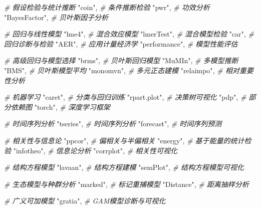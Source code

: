 \documentclass[
  twoside,12pt,fontset=none]{ctexbook}
\newenvironment{Shaded}{\begin{snugshade}}{\end{snugshade}}
\newcommand{\CommentTok}[1]{\textcolor[rgb]{0.56,0.35,0.01}{\textit{#1}}}
\newcommand{\NormalTok}[1]{#1}
\newcommand{\StringTok}[1]{\textcolor[rgb]{0.31,0.60,0.02}{#1}}
\begin{document}
\begin{Shaded}
\begin{Highlighting}[]
  \CommentTok{\# 假设检验与统计推断}
  \StringTok{"coin"}\NormalTok{,           }\CommentTok{\# 条件推断检验}
  \StringTok{"pwr"}\NormalTok{,            }\CommentTok{\# 功效分析}
  \StringTok{"BayesFactor"}\NormalTok{,    }\CommentTok{\# 贝叶斯因子分析}

  \CommentTok{\# 回归与线性模型}
  \StringTok{"lme4"}\NormalTok{,           }\CommentTok{\# 混合效应模型}
  \StringTok{"lmerTest"}\NormalTok{,       }\CommentTok{\# 混合模型检验}
  \StringTok{"car"}\NormalTok{,            }\CommentTok{\# 回归诊断与检验}
  \StringTok{"AER"}\NormalTok{,            }\CommentTok{\# 应用计量经济学}
  \StringTok{"performance"}\NormalTok{,    }\CommentTok{\# 模型性能评估}

  \CommentTok{\# 高级回归与模型选择}
  \StringTok{"brms"}\NormalTok{,           }\CommentTok{\# 贝叶斯回归模型}
  \StringTok{"MuMIn"}\NormalTok{,          }\CommentTok{\# 多模型推断}
  \StringTok{"BMS"}\NormalTok{,            }\CommentTok{\# 贝叶斯模型平均}
  \StringTok{"monomvn"}\NormalTok{,        }\CommentTok{\# 多元正态建模}
  \StringTok{"relaimpo"}\NormalTok{,       }\CommentTok{\# 相对重要性分析}

  \CommentTok{\# 机器学习}
  \StringTok{"caret"}\NormalTok{,          }\CommentTok{\# 分类与回归训练}
  \StringTok{"rpart.plot"}\NormalTok{,     }\CommentTok{\# 决策树可视化}
  \StringTok{"pdp"}\NormalTok{,            }\CommentTok{\# 部分依赖图}
  \StringTok{"torch"}\NormalTok{,          }\CommentTok{\# 深度学习框架}

  \CommentTok{\# 时间序列分析}
  \StringTok{"tseries"}\NormalTok{,        }\CommentTok{\# 时间序列分析}
  \StringTok{"forecast"}\NormalTok{,       }\CommentTok{\# 时间序列预测}

  \CommentTok{\# 相关性与信息论}
  \StringTok{"ppcor"}\NormalTok{,          }\CommentTok{\# 偏相关与半偏相关}
  \StringTok{"energy"}\NormalTok{,         }\CommentTok{\# 基于能量的统计检验}
  \StringTok{"infotheo"}\NormalTok{,       }\CommentTok{\# 信息论分析}
  \StringTok{"corrplot"}\NormalTok{,       }\CommentTok{\# 相关性可视化}

  \CommentTok{\# 结构方程模型}
  \StringTok{"lavaan"}\NormalTok{,         }\CommentTok{\# 结构方程建模}
  \StringTok{"semPlot"}\NormalTok{,        }\CommentTok{\# 结构方程模型可视化}

  \CommentTok{\# 生态模型与种群分析}
  \StringTok{"marked"}\NormalTok{,         }\CommentTok{\# 标记重捕模型}
  \StringTok{"Distance"}\NormalTok{,       }\CommentTok{\# 距离抽样分析}

  \CommentTok{\# 广义可加模型}
  \StringTok{"gratia"}\NormalTok{,         }\CommentTok{\# GAM模型诊断与可视化}


\end{Highlighting}
\end{Shaded}
\end{document}
